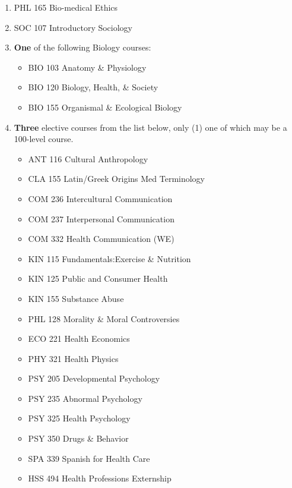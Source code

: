 \documentclass[
  letterpaper,
]{scrbook}
\providecommand{\tightlist}{%
  \setlength{\itemsep}{0pt}\setlength{\parskip}{0pt}}
\begin{document}
\begin{enumerate}
\def\labelenumi{\arabic{enumi}.}
\tightlist
\item
  PHL 165 Bio-medical Ethics
\item
  SOC 107 Introductory Sociology
\item
  \textbf{One} of the following Biology courses:

  \begin{itemize}
  \tightlist
  \item
    BIO 103 Anatomy \& Physiology
  \item
    BIO 120 Biology, Health, \& Society
  \item
    BIO 155 Organismal \& Ecological Biology
  \end{itemize}
\item
  \textbf{Three} elective courses from the list below, only (1) one of
  which may be a 100-level course.

  \begin{itemize}
  \tightlist
  \item
    ANT 116 Cultural Anthropology
  \item
    CLA 155 Latin/Greek Origins Med Terminology
  \item
    COM 236 Intercultural Communication
  \item
    COM 237 Interpersonal Communication
  \item
    COM 332 Health Communication (WE)
  \item
    KIN 115 Fundamentals:Exercise \& Nutrition
  \item
    KIN 125 Public and Consumer Health
  \item
    KIN 155 Substance Abuse
  \item
    PHL 128 Morality \& Moral Controversies
  \item
    ECO 221 Health Economics
  \item
    PHY 321 Health Physics
  \item
    PSY 205 Developmental Psychology
  \item
    PSY 235 Abnormal Psychology
  \item
    PSY 325 Health Psychology
  \item
    PSY 350 Drugs \& Behavior
  \item
    SPA 339 Spanish for Health Care
  \item
    HSS 494 Health Professions Externship
  \end{itemize}
\end{enumerate}
\end{document}
